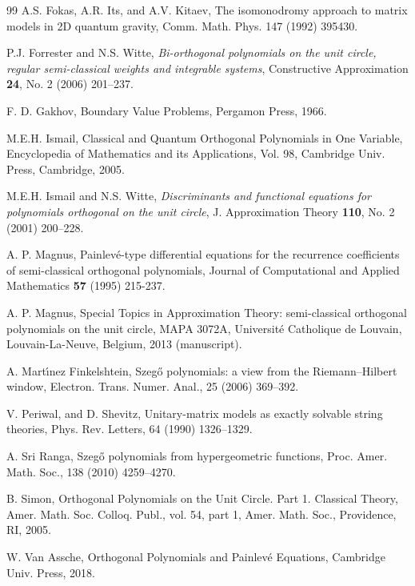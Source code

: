 \documentclass[12pt]{amsart}
\begin{document}
\begin{thebibliography}{99}
A.S. Fokas, A.R. Its, and A.V. Kitaev,
The isomonodromy approach to matrix models in 2D quantum gravity, 
Comm. Math. Phys. 147 (1992) 395430.


P.J. Forrester and N.S. Witte,
\emph{Bi-orthogonal polynomials on the unit circle, regular semi-classical weights and integrable systems},
Constructive Approximation \textbf{24}, No. 2 (2006) 201--237.





F. D. Gakhov,
Boundary Value Problems,
Pergamon Press, 1966.


M.E.H. Ismail, 
Classical and Quantum Orthogonal Polynomials in One Variable, 
Encyclopedia of Mathematics and its Applications, Vol. 98, 
Cambridge Univ. Press, Cambridge, 2005.

M.E.H. Ismail and N.S. Witte,
\emph{Discriminants and functional equations for polynomials orthogonal on the unit circle},
J. Approximation Theory \textbf{110}, No. 2 (2001) 200--228.

A. P. Magnus, 
Painlev\'e-type differential equations for the recurrence coefficients of semi-classical orthogonal polynomials, 
Journal of Computational and Applied Mathematics \textbf{57} (1995) 215-237. 

A. P. Magnus, 
Special Topics in Approximation Theory: semi-classical orthogonal polynomials on the unit circle, 
MAPA 3072A,
Universit\'e Catholique de Louvain, Louvain-La-Neuve, Belgium, 2013 (manuscript). 
 

A. Mart\'\i nez Finkelshtein,
Szeg\H o polynomials: a view from the Riemann--Hilbert window, Electron. Trans. Numer. Anal., 25 (2006) 369--392.

V. 
Periwal, 
and
D. 
Shevitz, 
Unitary-matrix models as exactly solvable string theories, 
Phys. Rev. Letters, 64 (1990) 1326--1329.


A. Sri Ranga, 
Szeg\H o polynomials from hypergeometric functions, 
Proc. Amer. Math. Soc., 138 (2010) 4259--4270.



B. Simon,
Orthogonal Polynomials on the Unit Circle. Part 1. Classical Theory, 
Amer. Math. Soc. Colloq. Publ., vol. {54}, part 1, Amer. Math. Soc., Providence, RI, 2005.






W. Van Assche, 
Orthogonal Polynomials and Painlev\'e Equations,
Cambridge Univ. Press, 2018. 





\end{thebibliography}

 
\end{document}
